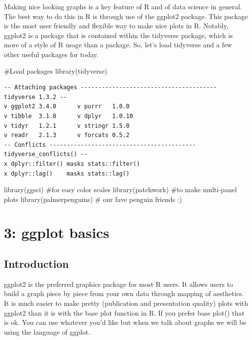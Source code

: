 \documentclass[
  letterpaper,
  DIV=11,
  numbers=noendperiod]{scrartcl}
\newenvironment{Shaded}{\begin{snugshade}}{\end{snugshade}}
\newcommand{\CommentTok}[1]{\textcolor[rgb]{0.37,0.37,0.37}{#1}}
\newcommand{\FunctionTok}[1]{\textcolor[rgb]{0.28,0.35,0.67}{#1}}
\newcommand{\NormalTok}[1]{\textcolor[rgb]{0.00,0.23,0.31}{#1}}
\begin{document}
Making nice looking graphs is a key feature of R and of data science in
general. The best way to do this in R is through use of the ggplot2
package. This package is the most user friendly and flexible way to make
nice plots in R. Notably, ggplot2 is a package that is contained within
the tidyverse package, which is more of a style of R usage than a
package. So, let's load tidyverse and a few other useful packages for
today.

\begin{Shaded}
\begin{Highlighting}[]
\CommentTok{\#Load packages}
\FunctionTok{library}\NormalTok{(tidyverse)}
\end{Highlighting}
\end{Shaded}

\begin{verbatim}
-- Attaching packages --------------------------------------- tidyverse 1.3.2 --
v ggplot2 3.4.0      v purrr   1.0.0 
v tibble  3.1.8      v dplyr   1.0.10
v tidyr   1.2.1      v stringr 1.5.0 
v readr   2.1.3      v forcats 0.5.2 
-- Conflicts ------------------------------------------ tidyverse_conflicts() --
x dplyr::filter() masks stats::filter()
x dplyr::lag()    masks stats::lag()
\end{verbatim}

\begin{Shaded}
\begin{Highlighting}[]
\FunctionTok{library}\NormalTok{(ggsci) }\CommentTok{\#for easy color scales}
\FunctionTok{library}\NormalTok{(patchwork) }\CommentTok{\#to make multi{-}panel plots }
\FunctionTok{library}\NormalTok{(palmerpenguins) }\CommentTok{\# our fave penguin friends :)}
\end{Highlighting}
\end{Shaded}

\hypertarget{ggplot-basics}{%
\section{\texorpdfstring{\textbf{3: ggplot
basics}}{3: ggplot basics}}\label{ggplot-basics}}

\subsection{\texorpdfstring{\textbf{Introduction}}{Introduction}}

ggplot2 is the preferred graphics package for most R users. It allows
users to build a graph piece by piece from your own data through mapping
of aesthetics. It is much easier to make pretty (publication and
presentation quality) plots with ggplot2 than it is with the base plot
function in R. If you prefer base plot() that is ok. You can use
whatever you'd like but when we talk about graphs we will be using the
language of ggplot.
\end{document}

